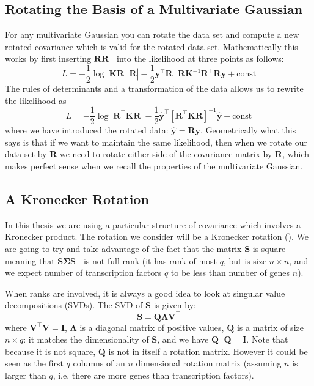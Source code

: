 \subsection{Rotating the Basis of a Multivariate Gaussian}
For any multivariate Gaussian you can rotate the data set and compute a new rotated covariance which is valid for the rotated data set. Mathematically this works by first inserting $\mathbf{R}\mathbf{R}^\top$ into the likelihood at three points as follows:
\begin{equation} \label{eq:LikelihoodRotation}
  L = -\frac{1}{2} \log |\mathbf{K}\mathbf{R}^\top\mathbf{R}| 
      - \frac{1}{2} \mathbf{y}^\top\mathbf{R}^\top\mathbf{R} \mathbf{K}^{-1}\mathbf{R}^\top\mathbf{R} \mathbf{y} 
      + \text{const}
\end{equation}
The rules of determinants and a transformation of the data allows us to rewrite the likelihood as
\begin{equation} \label{eq:LikelihoodRotationRerite}
  L = -\frac{1}{2} \log |\mathbf{R}^\top\mathbf{K}\mathbf{R}| 
      - \frac{1}{2} \hat{\mathbf{y}}^\top \left[\mathbf{R}^\top\mathbf{K}\mathbf{R}\right]^{-1}\hat{\mathbf{y}} 
      + \text{const}
\end{equation}
where we have introduced the rotated data: $\hat{\mathbf{y}}=\mathbf{R} \mathbf{y}$. 
Geometrically what this says is that if we want to maintain the same likelihood, then when we rotate our data set by $\mathbf{R}$ we need to rotate either side of the covariance matrix by $\mathbf{R}$, which makes perfect sense when we recall the properties of the multivariate Gaussian. 

\subsection{A Kronecker Rotation}
In this thesis we are using a particular structure of covariance which involves a Kronecker product. The rotation we consider will be a Kronecker rotation (\cite{Stegle:2011}). We are going to try and take advantage of the fact that the matrix $\mathbf{S}$ is square meaning that $\mathbf{S}\boldsymbol{\Sigma}\mathbf{S}^\top$ is not full rank (it has rank of most $q$, but is size $n\times n$, and we expect number of transcription factors $q$ to be less than number of genes $n$). 

When ranks are involved, it is always a good idea to look at singular value decompositions (SVDs). The SVD of $\mathbf{S}$ is given by:
\begin{equation} \label{eq:SVD}
\mathbf{S} = \mathbf{Q} \boldsymbol{\Lambda} \mathbf{V}^\top
\end{equation}
where $\mathbf{V}^\top \mathbf{V} = \mathbf{I}$, $\boldsymbol{\Lambda}$ is a diagonal matrix of positive values, $\mathbf{Q}$ is a matrix of size $n\times q$: it matches the dimensionality of $\mathbf{S}$, and we have $\mathbf{Q}^\top \mathbf{Q} = \mathbf{I}$. Note that because it is not square, $\mathbf{Q}$ is not in itself a rotation matrix. However it could be seen as the first $q$ columns of an $n$ dimensional rotation matrix (assuming $n$ is larger than $q$, i.e. there are more genes than transcription factors). 

